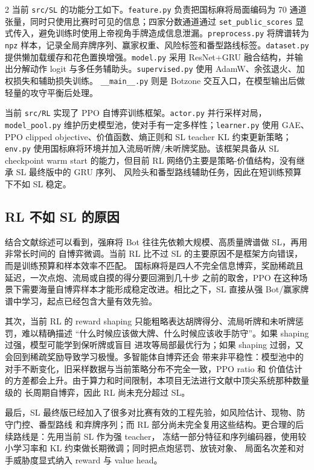 \documentclass{article}
\begin{document}
\begin{multicols}{2}
当前 \texttt{src/SL} 的功能分工如下。\texttt{feature.py} 负责把国标麻将局面编码为
70 通道张量，同时只使用比赛时可见的信息；四家分数通道通过 \texttt{set\_public\_scores}
显式传入，避免训练时使用上帝视角手牌造成信息泄漏。\texttt{preprocess.py} 将牌谱转为
\texttt{npz} 样本，记录全局弃牌序列、赢家权重、风险标签和番型路线标签。\texttt{dataset.py}
提供懒加载缓存和花色置换增强。\texttt{model.py} 采用 ResNet+GRU 融合结构，并输出分解动作
logit 与多任务辅助头。\texttt{supervised.py} 使用 AdamW、余弦退火、加权损失和辅助损失训练。
\texttt{\_\_main\_\_.py} 则是 Botzone 交互入口，在模型输出后做轻量的攻守平衡后处理。

当前 \texttt{src/RL} 实现了 PPO 自博弈训练框架。\texttt{actor.py} 并行采样对局，
\texttt{model\_pool.py} 维护历史模型池，使对手有一定多样性；\texttt{learner.py} 使用
GAE、PPO clipped objective、价值函数、熵正则和 SL teacher KL 约束更新策略；
\texttt{env.py} 使用国标麻将环境并加入流局听牌/未听牌奖励。该框架具备从 SL checkpoint
warm start 的能力，但目前 RL 网络仍主要是策略-价值结构，没有继承 SL 最终版中的 GRU 序列、
风险头和番型路线辅助任务，因此在短训练预算下不如 SL 稳定。

\subsection{RL 不如 SL 的原因}

结合文献综述可以看到，强麻将 Bot 往往先依赖大规模、高质量牌谱做 SL，再用非常长时间的
自博弈微调。当前 RL 比不过 SL 的主要原因不是框架方向错误，而是训练预算和样本效率不匹配。
国标麻将是四人不完全信息博弈，奖励稀疏且延迟，一次点炮、流局或自摸的得分要回溯到几十步
之前的取舍，PPO 在这种场景下需要海量自博弈样本才能形成稳定改进。相比之下，SL 直接从强
Bot/赢家牌谱中学习，起点已经包含大量有效先验。

其次，当前 RL 的 reward shaping 只能粗略表达胡牌得分、流局听牌和未听牌惩罚，难以精确描述
“什么时候应该做大牌、什么时候应该收手防守”。如果 shaping 过强，模型可能学到保听牌或盲目
进攻等局部最优行为；如果 shaping 过弱，又会回到稀疏奖励导致学习极慢。多智能体自博弈还会
带来非平稳性：模型池中的对手不断变化，旧采样数据与当前策略分布不完全一致，PPO ratio 和
价值估计的方差都会上升。由于算力和时间限制，本项目无法进行文献中顶尖系统那种数量级的
长周期自博弈，因此 RL 尚未充分超过 SL。

最后，SL 最终版已经加入了很多对比赛有效的工程先验，如风险估计、现物、防守门控、番型路线
和弃牌序列；而 RL 部分尚未完全复用这些结构。更合理的后续路线是：先用当前 SL 作为强 teacher，
冻结一部分特征和序列编码器，使用较小学习率和 KL 约束做长期微调；同时把点炮惩罚、放铳对象、
局面名次差和对手威胁度显式纳入 reward 与 value head。


\end{multicols}
\end{document}
